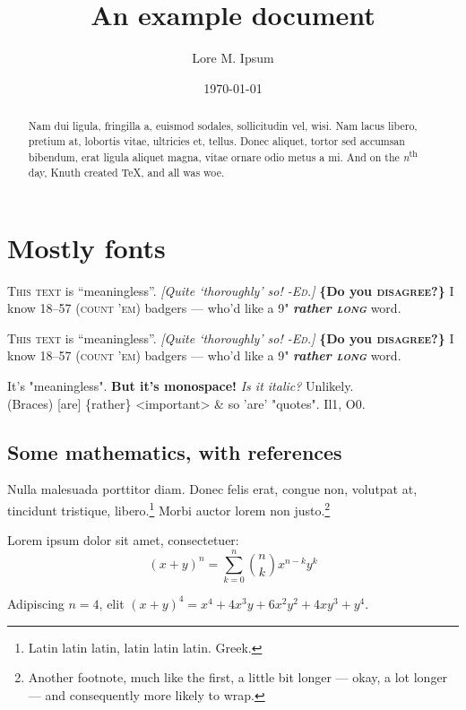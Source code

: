 \documentclass{rntz}
\title{An example document}
\author{Lore M. Ipsum}
\date{\today}
\begin{document}
\maketitle

\begin{abstract}
  Nam dui ligula, fringilla a, euismod sodales, sollicitudin vel, wisi. Nam
  lacus libero, pretium at, lobortis vitae, ultricies et, tellus. Donec aliquet,
  tortor sed accumsan bibendum, erat ligula aliquet magna, vitae ornare odio
  metus a mi. And on the \emph{n}\textsuperscript{th} day, Knuth created \TeX,
  and all was woe.
\end{abstract}

\section{Mostly fonts}\label{sec:one}

\newcommand{\testtext}{\textsc{This text} is ``meaningless''. \emph{[Quite
      `thoroughly' so! \textsc{-Ed.}]} {\bfseries \{Do you \textsc{disagree}?\}} I
  know 18--57 (\textsc{count 'em}) badgers --- who'd like a 9"
  {\bfseries\itshape rather \textsc{long}} word.}

\begingroup
\testtext\setlength\parskip{1em}\setlength\parindent{0em}

{\sffamily\testtext}

{\ttfamily It's "meaningless". \textbf{But it's monospace!}
  {\itshape
    Is it italic?} Unlikely.\\
  (Braces) [are] \{rather\} <important> \& so 'are' "quotes".
  Il1, O0.}
\endgroup

\subsection{Some mathematics, with references}

Nulla malesuada porttitor diam. Donec felis erat, congue non, volutpat at,
tincidunt tristique, libero.\footnote{Latin latin latin, latin latin latin.
  Greek.} Morbi auctor lorem non justo.\footnote{Another footnote, much like the
  first, a little bit longer --- okay, a lot longer --- and consequently more
  likely to wrap.}

\begin{theorem}[Binomial]\label{thm:binomial} Lorem ipsum dolor sit amet, consectetuer:
  \[ (x+y)^n = \sum_{k=0}^n \binom{n}{k} x^{n-k} y^k \]
\end{theorem}

\begin{corollary} Adipiscing $n=4$, elit
  \( (x+y)^4 = x^4 + 4x^3y + 6x^2y^2 + 4xy^3 + y^4 \).
\end{corollary}
\end{document}

